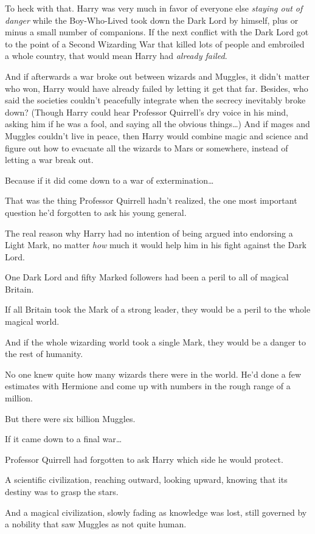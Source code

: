 To heck with that. Harry was very much in favor of everyone else \emph{staying out of danger} while the Boy-Who-Lived took down the Dark Lord by himself, plus or minus a small number of companions. If the next conflict with the Dark Lord got to the point of a Second Wizarding War that killed lots of people and embroiled a whole country, that would mean Harry had \emph{already failed}.

And if afterwards a war broke out between wizards and Muggles, it didn't matter who won, Harry would have already failed by letting it get that far. Besides, who said the societies couldn't peacefully integrate when the secrecy inevitably broke down? (Though Harry could hear Professor Quirrell's dry voice in his mind, asking him if he was a fool, and saying all the obvious things{\ldots}) And if mages and Muggles couldn't live in peace, then Harry would combine magic and science and figure out how to evacuate all the wizards to Mars or somewhere, instead of letting a war break out.

Because if it did come down to a war of extermination{\ldots}

That was the thing Professor Quirrell hadn't realized, the one most important question he'd forgotten to ask his young general.

The real reason why Harry had no intention of being argued into endorsing a Light Mark, no matter \emph{how} much it would help him in his fight against the Dark Lord.

One Dark Lord and fifty Marked followers had been a peril to all of magical Britain.

If all Britain took the Mark of a strong leader, they would be a peril to the whole magical world.

And if the whole wizarding world took a single Mark, they would be a danger to the rest of humanity.

No one knew quite how many wizards there were in the world. He'd done a few estimates with Hermione and come up with numbers in the rough range of a million.

But there were six billion Muggles.

If it came down to a final war{\ldots}

Professor Quirrell had forgotten to ask Harry which side he would protect.

A scientific civilization, reaching outward, looking upward, knowing that its destiny was to grasp the stars.

And a magical civilization, slowly fading as knowledge was lost, still governed by a nobility that saw Muggles as not quite human.


